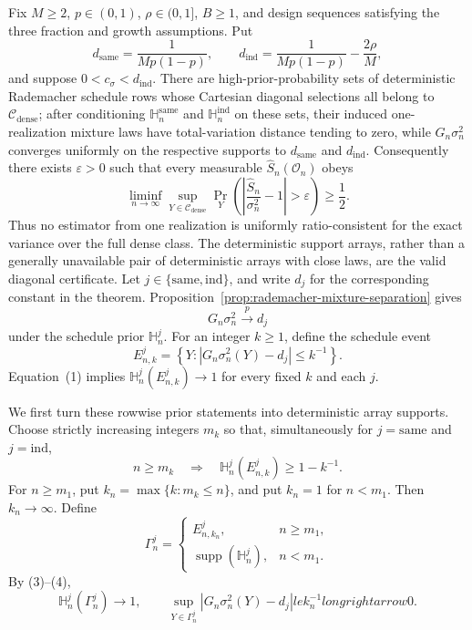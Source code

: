 Fix \(M\ge2\), \(p\in(0,1)\), \(\rho\in(0,1]\), \(B\ge1\), and design sequences satisfying the three fraction and growth assumptions. Put
\[
d_{\mathrm{same}}=\frac1{Mp(1-p)},\qquad
d_{\mathrm{ind}}=\frac1{Mp(1-p)}-\frac{2\rho}{M},
\]
and suppose \(0<c_\sigma<d_{\mathrm{ind}}\). There are high-prior-probability sets of deterministic Rademacher schedule rows whose Cartesian diagonal selections all belong to \(\mathcal C_{\mathrm{dense}}\); after conditioning \(\mathbb H_n^{\mathrm{same}}\) and \(\mathbb H_n^{\mathrm{ind}}\) on these sets, their induced one-realization mixture laws have total-variation distance tending to zero, while \(G_n\sigma_n^2\) converges uniformly on the respective supports to \(d_{\mathrm{same}}\) and \(d_{\mathrm{ind}}\). Consequently there exists \(\varepsilon>0\) such that every measurable \(\widehat S_n(\mathcal O_n)\) obeys
\[
\liminf_{n\to\infty}\sup_{Y\in\mathcal C_{\mathrm{dense}}}
\Pr_Y\left(\left|\frac{\widehat S_n}{\sigma_n^2}-1\right|>\varepsilon\right)
\ge\frac12.
\]
Thus no estimator from one realization is uniformly ratio-consistent for the exact variance over the full dense class. The deterministic support arrays, rather than a generally unavailable pair of deterministic arrays with close laws, are the valid diagonal certificate.
Let \(j\in\{\mathrm{same},\mathrm{ind}\}\), and write \(d_j\) for the corresponding constant in the theorem. Proposition~\ref{prop:rademacher-mixture-separation} gives
\[
G_n\sigma_n^2\xrightarrow{p}d_j
\tag{1}
\]
under the schedule prior \(\mathbb H_n^j\). For an integer \(k\ge1\), define the schedule event
\[
E_{n,k}^j=
\left\{Y:\left|G_n\sigma_n^2(Y)-d_j\right|\le k^{-1}\right\}.
\tag{2}
\]
Equation~(1) implies \(\mathbb H_n^j(E_{n,k}^j)\to1\) for every fixed \(k\) and each \(j\).

We first turn these rowwise prior statements into deterministic array supports. Choose strictly increasing integers \(m_k\) so that, simultaneously for \(j=\mathrm{same}\) and \(j=\mathrm{ind}\),
\[
n\ge m_k
\quad\Longrightarrow\quad
\mathbb H_n^j(E_{n,k}^j)\ge1-k^{-1}.
\tag{3}
\]
For \(n\ge m_1\), put \(k_n=\max\{k:m_k\le n\}\), and put \(k_n=1\) for \(n<m_1\). Then \(k_n\to\infty\). Define
\[
\Gamma_n^j=
\begin{cases}
E_{n,k_n}^j,&n\ge m_1,\\
\operatorname{supp}(\mathbb H_n^j),&n<m_1.
\end{cases}
\tag{4}
\]
By (3)--(4),
\[
\mathbb H_n^j(\Gamma_n^j)\longrightarrow1,
\qquad
\sup_{Y\in\Gamma_n^j}
\left|G_n\sigma_n^2(Y)-d_j\right|le k_n^{-1}longrightarrow0.
\tag{5}
\]

